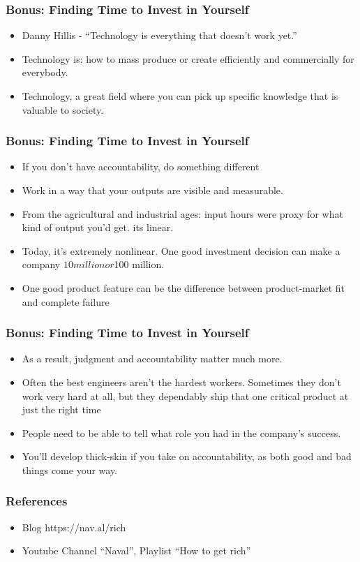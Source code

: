 \begin{frame}[fragile]
\frametitle{Bonus: Finding Time to Invest in Yourself}
\begin{itemize}
\item Danny Hillis - ``Technology is everything that doesn’t work yet.''
\item Technology is: how to mass produce or create efficiently and commercially for everybody.
\item Technology, a great field where you can pick up specific knowledge that is valuable to society.
\end{itemize}
\end{frame}

\begin{frame}[fragile]
\frametitle{Bonus: Finding Time to Invest in Yourself}
\begin{itemize}
\item If you don’t have accountability, do something different
\item Work in a way that your outputs are visible and
measurable. 
\item   From the agricultural and industrial ages: input hours were proxy for what kind of output you’d get.  its linear.
\item Today, it’s extremely nonlinear. One good investment decision can make a company $10 million or $100
million. 
\item One good product feature can be the difference between product-market fit and complete failure
\end{itemize}
\end{frame}

\begin{frame}[fragile]
\frametitle{Bonus: Finding Time to Invest in Yourself}
\begin{itemize}
\item As a result, judgment and accountability matter much more. 
\item Often the best engineers aren’t the hardest
workers. Sometimes they don’t work very hard at all, but they dependably ship that one critical product at just the right time
\item People need to be able to tell what role you had in the company’s success. 
\item You’ll develop thick-skin if you take on accountability, as both good and bad things come your way.
\end{itemize}
\end{frame}

\begin{frame}[fragile]\frametitle{References}
\begin{itemize}
\item Blog https://nav.al/rich
\item Youtube Channel ``Naval'', Playlist ``How to get rich''
\end{itemize}
\end{frame}